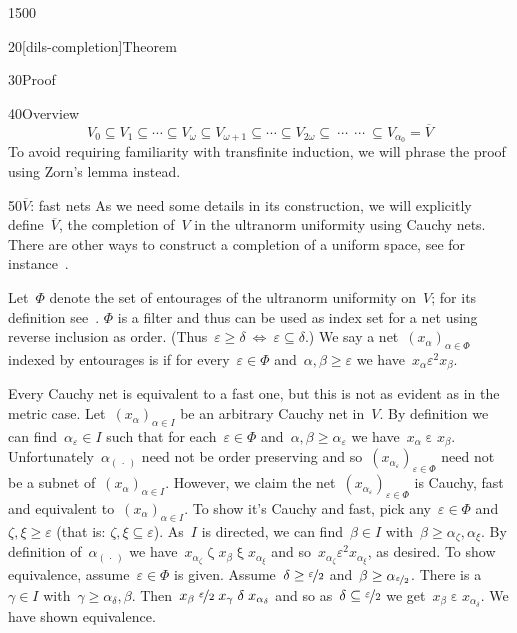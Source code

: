 \begin{parsec}{1500}
\begin{point}{20}[dils-completion]{Theorem}
\begin{point}{30}{Proof}
\begin{point}{40}{Overview}
\begin{equation*}
   V_0 \subseteq V_1 \subseteq \cdots \subseteq V_\omega \subseteq
   V_{\omega+1} \subseteq \cdots \subseteq V_{2\omega} \subseteq
       \ \cdots\ 
       \ \cdots\  \subseteq
   V_{\alpha_0} = \overline{V}
\end{equation*}
To avoid requiring familiarity with transfinite induction,
    we will phrase the proof using Zorn's lemma instead.
\end{point}
\begin{point}{50}{$\overline{V}$: fast nets}%
As we need some details in its construction,
    we will explicitly define~$\overline{V}$,
    the completion of~$V$ in the ultranorm uniformity
    using Cauchy nets.
There are other ways to construct a completion of a uniform space,
    see for instance~\cite[thm.~39.12]{willard}.

Let~$\Phi$ denote the set of entourages of the ultranorm
    uniformity on~$V$; for its definition see~.
$\Phi$ is a filter and thus can be used as index set for a net
    using reverse inclusion as order.
    (Thus~$\varepsilon \geq \delta
    \ \Leftrightarrow\ \varepsilon \subseteq \delta$.)
We say a net~$(x_\alpha)_{\alpha \in \Phi}$  indexed by entourages
is \Define{fast}\index{Cauchy net!fast} if for every~$\varepsilon \in \Phi$
        and~$\alpha,\beta \geq \varepsilon$
        we have~$x_\alpha \mathrel{\varepsilon^2} x_\beta$.

Every Cauchy net is equivalent to a fast one, but this is not as
    evident as in the metric case.
Let~$(x_\alpha)_{\alpha \in I}$
    be an arbitrary Cauchy net in~$V$.
By definition we can find~$\alpha_\varepsilon \in I$
    such that for each~$\varepsilon \in \Phi$
    and~$\alpha,\beta \geq \alpha_\varepsilon$
    we have~$x_\alpha \mathrel{\varepsilon} x_\beta$.
Unfortunately~$\alpha_{(\,\cdot\,)}$ need not be order preserving
    and so~$(x_{\alpha_{\varepsilon}})_{\varepsilon\in\Phi}$
    need not be a subnet of~$(x_\alpha)_{\alpha \in I}$.
However, we claim the net~$(x_{\alpha_{\varepsilon}})_{\varepsilon\in\Phi}$
    is Cauchy, fast and equivalent to~$(x_{\alpha})_{\alpha\in I}$.
To show it's Cauchy and fast, pick any~$\varepsilon \in \Phi$
    and~$\zeta,\xi \geq \varepsilon$
    (that is: $\zeta,\xi \subseteq \varepsilon$).
As~$I$ is directed, we can find~$\beta\in I$
    with~$\beta \geq \alpha_\zeta, \alpha_\xi$.
By definition of~$\alpha_{(\,\cdot\,)}$
    we have~$x_{\alpha_\zeta} \mathrel\zeta x_{\beta}
        \mathrel\xi x_{\alpha_\xi}$
        and so~$x_{\alpha_\zeta} \mathrel{\varepsilon^2}
                x_{\alpha_\xi}$, as desired.
To show equivalence, assume~$\varepsilon \in \Phi$ is given.
Assume~$\delta \geq \nicefrac{\varepsilon}{2}$
and~$\beta \geq \alpha_{\nicefrac{\varepsilon}{2}}$.
There is a~$\gamma \in I$ with~$\gamma \geq \alpha_\delta,\beta$.
Then~$x_\beta \mathrel{\nicefrac{\varepsilon}{2}}
x_{\gamma} \mathrel{\delta} x_{\alpha_{\delta}}$
and so as~$\delta\subseteq \nicefrac{\varepsilon}{2}$
we get~$x_\beta \mathrel\varepsilon x_{\alpha_\delta}$.
We have shown equivalence.


\end{point}
\end{point}
\end{point}
\end{parsec}
